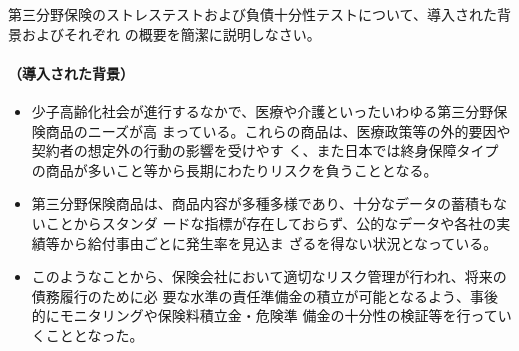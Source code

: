 \documentclass[report,gutter=10mm,fore-edge=10mm,uplatex,dvipdfmx]{jlreq}
\begin{document}

第三分野保険のストレステストおよび負債十分性テストについて、導入された背景およびそれぞれ
の概要を簡潔に説明しなさい。
\paragraph{（導入された背景）}
\begin{itemize}
 \item 少子高齢化社会が進行するなかで、医療や介護といったいわゆる第三分野保険商品のニーズが高
まっている。これらの商品は、医療政策等の外的要因や契約者の想定外の行動の影響を受けやす
く、また日本では終身保障タイプの商品が多いこと等から長期にわたりリスクを負うこととなる。
 \item 第三分野保険商品は、商品内容が多種多様であり、十分なデータの蓄積もないことからスタンダ
ードな指標が存在しておらず、公的なデータや各社の実績等から給付事由ごとに発生率を見込ま
ざるを得ない状況となっている。
 \item このようなことから、保険会社において適切なリスク管理が行われ、将来の債務履行のために必
要な水準の責任準備金の積立が可能となるよう、事後的にモニタリングや保険料積立金・危険準
備金の十分性の検証等を行っていくこととなった。
\end{itemize}
\end{document}

